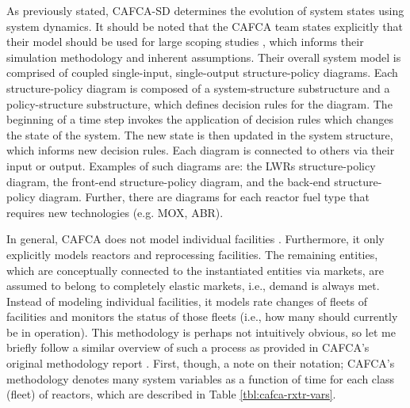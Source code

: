 As previously stated, CAFCA-SD determines the evolution of system states using
system dynamics. It should be noted that the CAFCA team states explicitly that
their model should be used for large scoping studies \cite{guerin_impact_2009},
which informs their simulation methodology and inherent assumptions. Their
overall system model is comprised of coupled single-input, single-output
structure-policy diagrams. Each structure-policy diagram is composed of a
system-structure substructure and a policy-structure substructure, which defines
decision rules for the diagram. The beginning of a time step invokes the
application of decision rules which changes the state of the system. The new
state is then updated in the system structure, which informs new decision
rules. Each diagram is connected to others via their input or output. Examples
of such diagrams are: the LWRs structure-policy diagram, the front-end
structure-policy diagram, and the back-end structure-policy diagram. Further,
there are diagrams for each reactor fuel type that requires new technologies
(e.g. MOX, ABR).

In general, CAFCA does not model individual
facilities \cite{guerin_impact_2009}. Furthermore, it only explicitly models
reactors and reprocessing facilities. The remaining entities, which are
conceptually connected to the instantiated entities via markets, are assumed to
belong to completely elastic markets, i.e., demand is always met. Instead of
modeling individual facilities, it models rate changes of fleets of facilities
and monitors the status of those fleets (i.e., how many should currently be in
operation). This methodology is perhaps not intuitively obvious, so let me
briefly follow a similar overview of such a process as provided in CAFCA's
original methodology report \cite{busquim_e_silva_system_2008}. First, though, a
note on their notation; CAFCA's methodology denotes many system variables as a
function of time for each class (fleet) of reactors, which are described in
Table \ref{tbl:cafca-rxtr-vars}.

